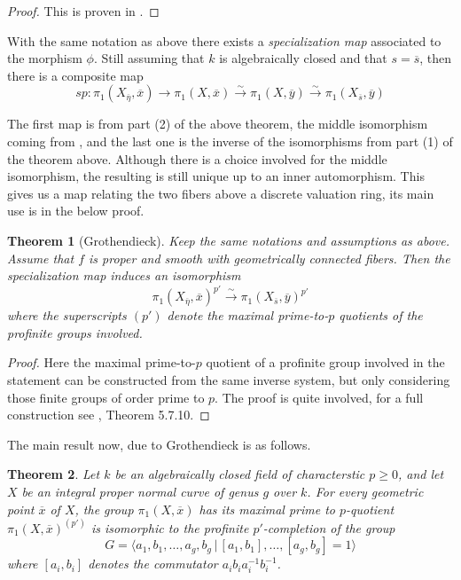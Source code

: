 \documentclass{article}
\newtheorem{theorem}{Theorem}[section]
\theoremstyle{definition}
\theoremstyle{remark}
\theoremstyle{plain}
\begin{document}
 \begin{proof}
	 This is proven in \cite{grothendieck}.
 \end{proof}

 With the same notation as above there exists a \textit{specialization map} associated to the morphism $\phi$.
 Still assuming that $k$ is algebraically closed and that $s = \overline{s}$, then there is a composite map
 \[\textit{sp}: \pi_1(X_{\overline{\eta}}, \overline{x}) \to \pi_1(X, \overline{x}) \xrightarrow{\sim} \pi_1(X, \overline{y}) \xrightarrow{\sim} \pi_1(X_{\overline{s}}, \overline{y})\]

 The first map is from part (2) of the above theorem, the middle isomorphism coming from , and the last one is the inverse of the isomorphisms from part (1) of the theorem above.
Although there is a choice involved for the middle isomorphism, the resulting is still unique up to an inner automorphism.
This gives us a map relating the two fibers above a discrete valuation ring, its main use is in the below proof.

\begin{theorem}[Grothendieck] 
	Keep the same notations and assumptions as above.
	Assume that $f$ is proper and smooth with geometrically connected fibers.
	Then the specialization map induces an isomorphism 
	\[\pi_1(X_{\overline{\eta}}, \overline{x})^{p'} \xrightarrow{\sim} \pi_1(X_{\overline{s}}, \overline{y})^{p'}\]
	where the superscripts $(p')$ denote the maximal prime-to-$p$ quotients of the profinite groups involved.
	
\end{theorem}

 \begin{proof}
	 Here the maximal prime-to-$p$ quotient of a profinite group involved in the statement can be constructed from the same inverse system, but only considering those finite groups of order prime to $p$.
	 The proof is quite involved, for a full construction see \cite{Szamuely}, Theorem 5.7.10.
 \end{proof}
 
 The main result now, due to Grothendieck is as follows.
\begin{theorem}
	Let $k$ be an algebraically closed field of characterstic $p \geq 0$, and let $X$ be an integral proper normal curve of genus $g$ over $k$.
	For every geometric point $\overline{x}$ of $X$, the group $\pi_1(X, \overline{x})$ has its maximal prime to $p$-quotient $\pi_1(X, \overline{x})^{(p')}$ is isomorphic to the profinite $p'$-completion of the group
	\[G = \langle a_1, b_1, \dots, a_g, b_g \,|\, [a_1,b_1], \dots, [a_g, b_g] = 1\rangle\]
	where $[a_i, b_i]$ denotes the commutator $a_i b_i a_i^{-1} b_i^{-1}$.
\end{theorem}
\end{document}

